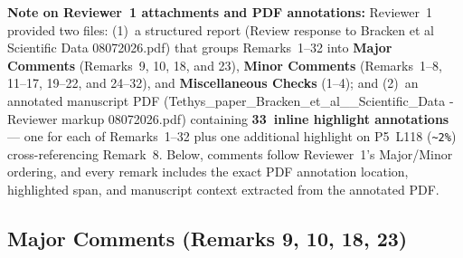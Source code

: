 \documentclass[11pt,letterpaper]{article}
\newcommand{\fname}[1]{{\ttfamily #1}}
\begin{document}
{\footnotesize\color{MutedGray}\raggedright
\textbf{Note on Reviewer~1 attachments and PDF annotations:}
Reviewer~1 provided two files: (1)~a structured report (\fname{Review response to Bracken et al Scientific Data 08072026.pdf}) that groups Remarks~1--32 into \textbf{Major Comments} (Remarks~9, 10, 18, and 23), \textbf{Minor Comments} (Remarks~1--8, 11--17, 19--22, and 24--32), and \textbf{Miscellaneous Checks} (1--4); and (2)~an annotated manuscript PDF (\fname{Tethys\_\allowbreak paper\_\allowbreak Bracken\_\allowbreak et\_\allowbreak al\_\allowbreak 2026\_\allowbreak Scientific\_\allowbreak Data - Reviewer markup 08072026.pdf}) containing \textbf{33~inline highlight annotations} --- one for each of Remarks~1--32 plus one additional highlight on P5~L118 (\texttt{\textasciitilde 2\%}) cross-referencing Remark~8. Below, comments follow Reviewer~1's Major/Minor ordering, and every remark includes the exact PDF annotation location, highlighted span, and manuscript context extracted from the annotated PDF.\par}

\subsection{Major Comments (Remarks 9, 10, 18, 23)}
\end{document}
